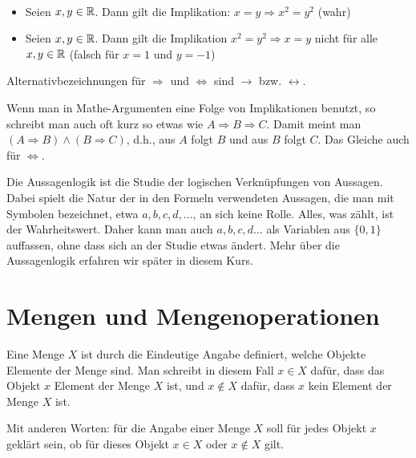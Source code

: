 \begin{bsp}\
	\begin{itemize}
		\item Seien $ x,y \in \mathbb{R}$. Dann gilt die Implikation: $x = y \Rightarrow x^2 = y^2 $ (wahr)
		\item Seien $x,y \in \mathbb{R}$. Dann gilt die Implikation $ x^2 = y^2 \Rightarrow x = y $ nicht für alle $ x,y \in \mathbb{R} $ (falsch für $x=1$ und $y=-1$)	
	\end{itemize}
\end{bsp}

\begin{bem}
	Alternativbezeichnungen für $\Rightarrow$ und $\Leftrightarrow$ sind $\rightarrow$ bzw. $\leftrightarrow$. 
\end{bem} 

\begin{bem}
	Wenn man in Mathe-Argumenten eine Folge von Implikationen benutzt, so schreibt man auch oft kurz so etwas wie $A \Rightarrow B \Rightarrow C$. Damit meint man  $(A \Rightarrow B) \wedge (B \Rightarrow C)$, d.h., aus $A$ folgt $B$ und aus $B$ folgt $C$. Das Gleiche auch für $\Leftrightarrow$. 
\end{bem} 


\begin{bem}
	Die Aussagenlogik ist die Studie der logischen Verknüpfungen von Aussagen. Dabei spielt die Natur der in den Formeln verwendeten Aussagen, die man mit Symbolen bezeichnet, etwa $a,b, c, d, \ldots$, an sich keine Rolle. Alles, was zählt, ist der Wahrheitswert. Daher kann man auch $a,b,c,d \ldots$ als Variablen aus $\{0,1\}$ auffassen, ohne dass sich an der Studie etwas ändert. Mehr über die Aussagenlogik erfahren wir später in diesem Kurs. 
\end{bem} 

\clearpage
\section{Mengen und Mengenoperationen}


\begin{defn} 
	Eine Menge $X$ ist durch die Eindeutige Angabe definiert, welche Objekte Elemente der Menge sind. Man schreibt in diesem Fall $x \in X$ dafür, dass das Objekt $x$ Element der Menge $X$ ist, und $x \not\in X$ dafür, dass $x$ kein Element der Menge $X$ ist. 
	
	Mit anderen Worten: für die Angabe einer Menge $X$ soll für jedes Objekt $x$ geklärt sein, ob für dieses Objekt $x \in X$ oder $x\not \in X$ gilt. 
\end{defn} 

